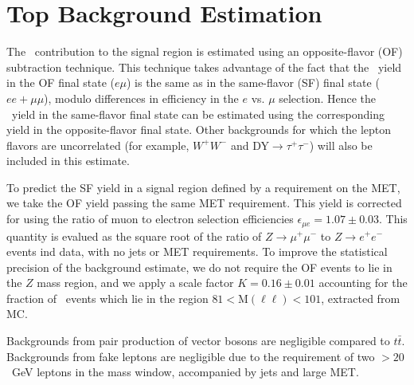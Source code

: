 \section{Top Background Estimation}
\label{sec:topbkg}

The \ttbar\ contribution to the signal region is estimated using an opposite-flavor (OF) subtraction technique.
This technique takes advantage of the fact that the \ttbar\ yield in the 
OF final state ($e\mu$) is the same as in the same-flavor (SF) final state
($ee+\mu\mu$), modulo differences in efficiency in the $e$ vs. $\mu$ selection.
Hence the \ttbar\ yield in the same-flavor final state can be estimated
using the corresponding yield in the opposite-flavor final state. 
Other backgrounds for which the lepton flavors are
uncorrelated (for example, $W^+W^-$ and DY$\rightarrow \tau^+\tau^-$) will also be included in
this estimate.

To predict the SF yield in a signal region defined by a requirement on the MET, we take the 
OF yield passing the same MET requirement. This yield is corrected for using the ratio of
muon to electron selection efficiencies $\epsilon_{\mu e}=1.07 \pm 0.03$.
This quantity is evalued as the square root of the ratio of $Z\to\mu^+\mu^-$ to $Z\to e^+e^-$
events ind data, with no jets or MET requirements. To improve the statistical precision
of the background estimate, we do not require the OF events to lie in the $Z$ mass region,
and we apply a scale factor $K=0.16 \pm 0.01$ accounting for the fraction of \ttbar\ events
which lie in the region $81 < \mathrm{M(\ell\ell)} < 101$\GeVcc, extracted from MC.

Backgrounds from pair production of vector bosons are negligible compared to $t\bar{t}$.
Backgrounds from fake leptons are negligible due to the requirement of two \pt$ > 20$~GeV leptons
in the \Z mass window, accompanied by jets and large MET.
